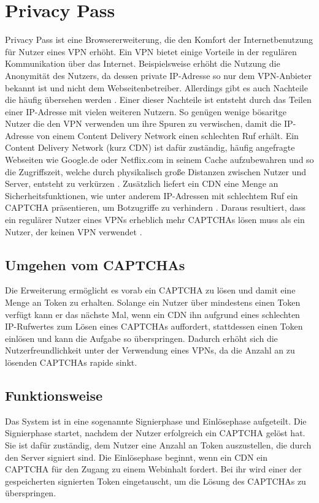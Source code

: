\documentclass[
	fontsize=12pt,
	headings=small,
	parskip=half,           %
	bibliography=totoc,
	numbers=noenddot,       %
	open=any,               %
]{scrreprt}
\begin{document}
\section{Privacy Pass}
\label{sec:privacy-pass}
Privacy Pass ist eine Browsererweiterung, die den Komfort der Internetbenutzung für Nutzer eines VPN erhöht. Ein VPN bietet einige Vorteile in der regulären Kommunikation über das Internet. Beispielsweise erhöht die Nutzung die Anonymität des Nutzers, da dessen private IP-Adresse so nur dem VPN-Anbieter bekannt ist und nicht dem Webseitenbetreiber. Allerdings gibt es auch Nachteile die häufig übersehen werden \cite{pp-Abbas2023Security}. Einer dieser Nachteile ist entsteht durch das Teilen einer IP-Adresse mit vielen weiteren Nutzern. So genügen wenige bösaritge Nutzer die den VPN verwenden um ihre Spuren zu verwischen, damit die IP-Adresse von einem Content Delivery Network einen schlechten Ruf erhält. Ein Content Delivery Network (kurz CDN) ist dafür zuständig, häufig angefragte Webseiten wie Google.de oder Netflix.com in seinem Cache aufzubewahren und so die Zugriffszeit, welche durch physikalisch große Distanzen zwischen Nutzer und Server, entsteht zu verkürzen \cite{pp-cdn}. Zusätzlich liefert ein CDN eine Menge an Sicherheitsfunktionen, wie unter anderem IP-Adressen mit schlechtem Ruf ein CAPTCHA präsentieren, um Botzugriffe zu verhindern \cite{pp-Ghaznavi2021Content}. Daraus resultiert, dass ein regulärer Nutzer eines VPNs erheblich mehr CAPTCHAs lösen muss als ein Nutzer, der keinen VPN verwendet \cite{pp-davidson2018privacy}.

\subsection{Umgehen vom CAPTCHAs}
Die Erweiterung ermöglicht es vorab ein CAPTCHA zu lösen und damit eine Menge an Token zu erhalten. Solange ein Nutzer über mindestens einen Token verfügt kann er das nächste Mal, wenn ein CDN ihn aufgrund eines schlechten IP-Rufwertes zum Lösen eines CAPTCHAs auffordert, stattdessen einen Token einlösen und kann die Aufgabe so überspringen. Dadurch erhöht sich die Nutzerfreundlichkeit unter der Verwendung eines VPNs, da die Anzahl an zu lösenden CAPTCHAs rapide sinkt. \cite{pp-davidson2018privacy}

\subsection{Funktionsweise}
Das System ist in eine sogenannte Signierphase und Einlösephase aufgeteilt. Die Signierphase startet, nachdem der Nutzer erfolgreich ein CAPTCHA gelöst hat. Sie ist dafür zuständig, dem Nutzer eine Anzahl an Token auszustellen, die durch den Server signiert sind. Die Einlösephase beginnt, wenn ein CDN ein CAPTCHA für den Zugang zu einem Webinhalt fordert. Bei ihr wird einer der gespeicherten signierten Token eingetauscht, um die Lösung des CAPTCHAs zu überspringen. 
\end{document}
